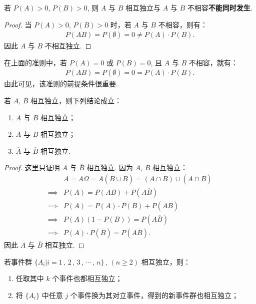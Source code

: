 \documentclass[12pt, a4paper, oneside, UTF8]{ctexbook}
\begin{document}
\begin{criterion}
    若 \(P\left(A\right) > 0\), \(P\left(B\right) > 0\), 则 \(A\) 与 \(B\) 相互独立与 \(A\) 与 \(B\) 不相容\textbf{不能同时发生}.
\end{criterion}

\begin{proof}
    当 \(P\left(A\right) > 0\), \(P\left(B\right) > 0\) 时，若 \(A\) 与 \(B\) 不相容，则有：
    \begin{align*}
        P\left(AB\right) = P\left(\emptyset\right) = 0 \neq P\left(A\right)\cdot P\left(B\right).
    \end{align*}
    因此 \(A\) 与 \(B\) 不相互独立.
\end{proof}

\begin{rmk}
    在上面的准则中，若 \(P\left(A\right) = 0\) 或 \(P\left(B\right) = 0\), 且 \(A\) 与 \(B\) 不相容，就有：
    \begin{align*}
        P\left(AB\right) = P\left(\emptyset\right) = 0 = P\left(A\right)\cdot P\left(B\right).
    \end{align*}
    由此可见，该准则的前提条件很重要.
\end{rmk}

\begin{corollary}
    若 \(A\), \(B\) 相互独立，则下列结论成立：
    \begin{enumerate}
        \item \(A\) 与 \(\overline{B}\) 相互独立；
        \item \(\overline{A}\) 与 \(B\) 相互独立；
        \item \(\overline{A}\) 与 \(\overline{B}\) 相互独立.
    \end{enumerate}
\end{corollary}

\begin{proof}
    这里只证明 \(A\) 与 \(\overline{B}\) 相互独立. 因为 \(A\), \(B\) 相互独立：
    \begin{align*}
        & A = A \Omega = A\left(B \cup \overline{B}\right) = \left(A\cap B\right)\cup \left(A \cap \overline{B}\right)\\
        \implies & P\left(A\right) = P\left(AB\right) + P\left(A \overline{B}\right)\\ 
        \implies & P\left(A\right) = P\left(A\right) \cdot P\left(B\right) + P\left(A\overline{B}\right) \\ 
        \implies & P\left(A\right)\left(1 - P\left(B\right)\right) = P\left(A \overline{B}\right) \\ 
        \implies & P\left(A\right)\cdot P\left(\overline{B}\right) = P\left(A \overline{B}\right).
    \end{align*}
    因此 \(A\) 与 \(\overline{B}\) 相互独立.
\end{proof}

\begin{corollary}
    若事件群 \(\{A_i | i = 1\,,\,2\,,\,3\,,\,\cdots\,,\,n\}\,,\,\left(n \geqslant 2\right)\) 相互独立，则：
    \begin{enumerate}
        \item 任取其中 \(k\) 个事件也都相互独立；
        \item 将 \(\{A_i\}\) 中任意 \(j\) 个事件换为其对立事件，得到的新事件群也相互独立；
    \end{enumerate}
\end{corollary}
\ifx\allfiles\undefined
\end{document}
